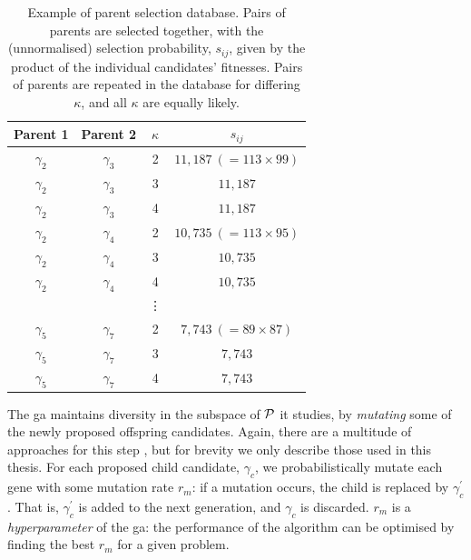 \begin{table}[H]
    \begin{center}
        \begin{tabular}{cccc}
            Parent 1 & Parent 2 & $\kappa$ & $s_{ij}$ \\
            \hline 
            $\gamma_2$ & $\gamma_3$ & 2 & $11,187 \ (=113 \times 99 )$ \\
            $\gamma_2$ & $\gamma_3$ & 3 & $11,187$ \\
            $\gamma_2$ & $\gamma_3$ & 4 & $11,187$ \\

            $\gamma_2$ & $\gamma_4$ & 2 & $10,735 \ (=113 \times 95)$ \\
            $\gamma_2$ & $\gamma_4$ & 3 & $10,735$ \\
            $\gamma_2$ & $\gamma_4$ & 4 & $10,735$ \\

             & & \vdots & \\

            $\gamma_5$ & $\gamma_7$ & 2 & $7,743 \ (=89 \times 87)$ \\
            $\gamma_5$ & $\gamma_7$ & 3 & $7,743$ \\
            $\gamma_5$ & $\gamma_7$ & 4 & $7,743$ \\

        \end{tabular}
    \end{center}
    \caption[Genetic algorithm parent selection database]{
        Example of parent selection database. 
        Pairs of parents are selected together, with the (unnormalised) selection probability, $s_{ij}$, 
        given by the product of the individual candidates' fitnesses. 
        Pairs of parents are repeated in the database for differing $\kappa$, 
            and all $\kappa$ are equally likely. 
    }
    \label{table:selection_database}
\end{table}
    

The \gls{ga} maintains diversity in the subspace of $\mathcal{P}$ it studies, 
    by \emph{mutating} some of the newly proposed offspring candidates. 
Again, there are a multitude of approaches for this step \cite{schmitt2001theory}, 
    but for brevity we only describe those used in this thesis.
For each proposed child candidate, $\gamma_{c}$, we probabilistically mutate each gene with some mutation rate $r_m$:
    if a mutation occurs, the child is replaced by $\gamma_c^{\prime}$. 
That is, $\gamma_c^{\prime}$  is added to the next generation, and $\gamma_c$ is discarded. 
$r_m$ is a \emph{hyperparameter} of the \gls{ga}:
    the performance of the algorithm can be optimised by finding the best $r_m$ 
    for a given problem. 

